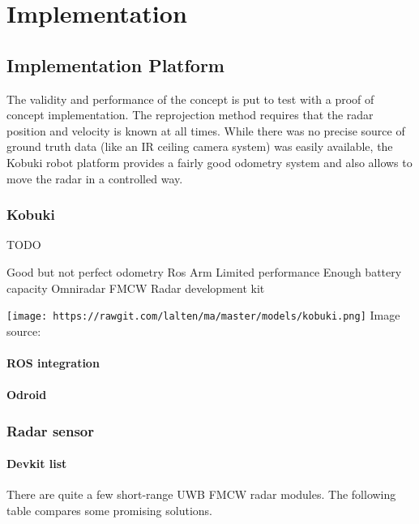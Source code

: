 
\chapter{Implementation}\label{implementation}

\section{Implementation Platform}\label{implementation-platform}

The validity and performance of the concept is put to test with a proof
of concept implementation. The reprojection method requires that the
radar position and velocity is known at all times. While there was no
precise source of ground truth data (like an IR ceiling camera system)
was easily available, the Kobuki robot platform provides a fairly good
odometry system and also allows to move the radar in a controlled way.

\subsection{Kobuki}\label{kobuki}

TODO

Good but not perfect odometry Ros Arm Limited performance Enough battery
capacity Omniradar FMCW Radar development kit

\texttt{[image: https://rawgit.com/lalten/ma/master/models/kobuki.png]}
Image source: \cite{DesignK2013}

\subsubsection{ROS integration}\label{ros-integration}

\subsubsection{Odroid}\label{odroid}

\subsection{Radar sensor}\label{radar-sensor}

\subsubsection{Devkit list}\label{devkit-list}

There are quite a few short-range UWB FMCW radar modules. The following
table compares some promising solutions.

